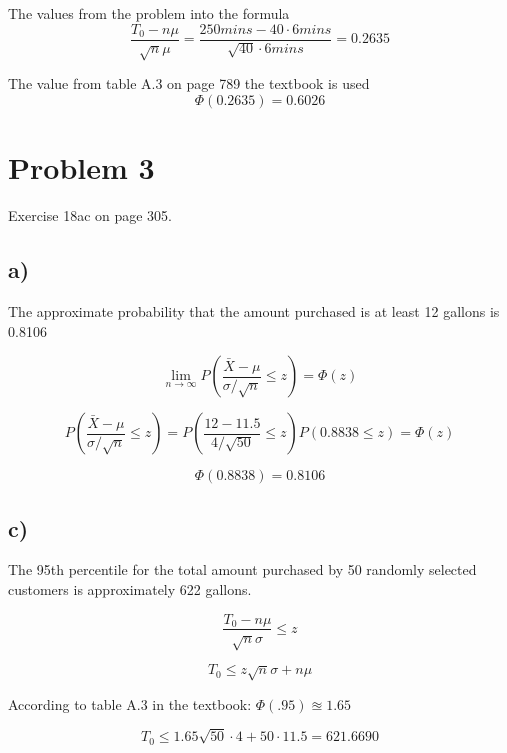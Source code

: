 \documentclass[a4paper,11pt]{article}
\begin{document}
The values from the problem into the formula
\[ \frac{T_0 - n \mu}{\sqrt{n} \mu} = \frac{250 mins - 40 \cdot 6 mins }{\sqrt{40} \cdot 6 mins} = 0.2635 \]

\vspace{1cm}
The value from table A.3  on page 789 the textbook is used
\[ \Phi(0.2635) = 0.6026\]

\clearpage

\section*{Problem 3}

Exercise 18ac on page 305.

\subsection*{a)}

The approximate probability that the amount purchased is at least 12 gallons is 0.8106

\[ \lim_{n \rightarrow \infty} P\left(\frac{\bar{X} - \mu}{\sigma / \sqrt{n}} \le z \right) = \Phi(z)\]

\[ P\left(\frac{\bar{X} - \mu}{\sigma / \sqrt{n}} \le z \right) = P\left(\frac{12 - 11.5}{4 / \sqrt{50}} \le z \right) P(0.8838 \le z) =  \Phi(z)\]

\[\Phi(0.8838) = 0.8106 \]

\subsection*{c)}

The 95th percentile for the total amount purchased by 50 randomly selected customers is approximately 622 gallons.

\[ \frac{T_0 - n \mu}{\sqrt{n} \sigma} \le z\]

\[ T_0 \le z \sqrt{n} \sigma +  n \mu \]

\vspace{5mm}
According to table A.3 in the textbook: $ \Phi(.95) \approxeq 1.65 $


\[ T_0 \le 1.65 \sqrt{50} \cdot 4 +  50 \cdot 11.5 = 621.6690 \]
\end{document}
